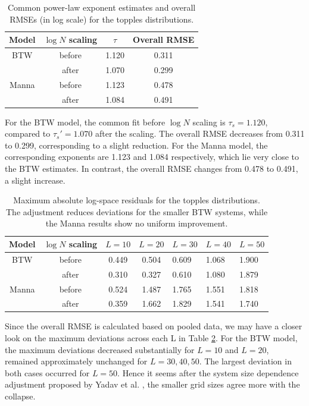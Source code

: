 \begin{table}[htbp]
    \centering
    \begin{tabular}{cccc}\toprule
         Model&  $\log N$ scaling&  $\tau$& Overall RMSE\\\midrule
         BTW&  before&  1.120& 0.311\\
         &  after&  1.070& 0.299\\
         Manna&  before&  1.123& 0.478\\
         &  after&  1.084& 0.491\\ \bottomrule
    \end{tabular}
    \caption{Common power-law exponent estimates and overall RMSEs (in log scale) for the topples distributions. }
    \label{tab:topples-summary}
\end{table}

For the BTW model, the common fit before $\log N$ scaling is $\tau_s=1.120$, compared to $\tau_s'=1.070$ after the scaling. The overall RMSE decreases from 0.311 to 0.299, corresponding to a slight reduction. For the Manna model, the corresponding exponents are 1.123 and 1.084 respectively, which lie very close to the BTW estimates. In contrast, the overall RMSE changes from 0.478 to 0.491, a slight increase.\\
\begin{table}[htbp]
    \centering
    \begin{tabular}{cccclll}\toprule
         Model&  $\log N$ scaling&  $L=10$&  $L=20$& $L=30$& $L=40$& $L=50$\\\midrule
         BTW&  before&  0.449&  0.504& 0.609& 1.068& 1.900\\
         &  after&  0.310&  0.327& 0.610& 1.080& 1.879\\
         Manna&  before&  0.524&  1.487& 1.765& 1.551& 1.818\\
         &  after&  0.359&  1.662& 1.829& 1.541& 1.740\\ \bottomrule
    \end{tabular}
    \caption{Maximum absolute log-space residuals for the topples distributions. The adjustment reduces deviations for the smaller BTW systems, while the Manna results show no uniform improvement.}
    \label{tab:topples-maxdev}
\end{table}

Since the overall RMSE is calculated based on pooled data, we may have a closer look on the maximum deviations across each L in Table \ref{tab:topples-maxdev}. For the BTW model, the maximum deviations decreased substantially for $L=10$ and $L=20$, remained approximately unchanged for $L=30,40,50$. The largest deviation in both cases occurred for $L=50$. Hence it seems after the system size dependence adjustment proposed by Yadav et al. \cite{Yadav2022FiniteSize}, the smaller grid sizes agree more with the collapse.\\

